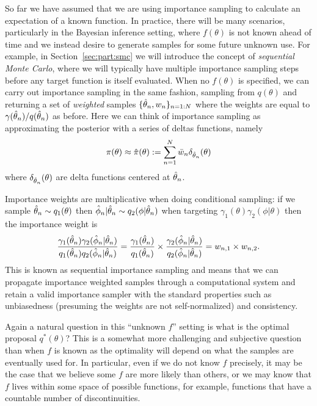 So far we have assumed that we are using importance sampling to calculate an expectation 
of a known function.  In practice, there will be many scenarios, particularly in the Bayesian inference setting,
where $f(\theta)$ is not known ahead of time and we instead desire to generate samples
for some future unknown use.  For example, in Section~\ref{sec:part:smc} we will introduce the concept
of \emph{sequential Monte Carlo}, where we will typically have multiple importance sampling steps
before any target function is itself evaluated.
When no $f(\theta)$ is specified, we can carry out importance sampling in the
same fashion, sampling from $q (\theta)$ and returning a set of \emph{weighted} samples
$\{\hat{\theta}_n,w_n\}_{n=1:N}$ where the weights are equal to $\gamma(\hat{\theta}_n) / q(\hat{\theta}_n)$ as before.
Here we can think of importance sampling as approximating the posterior with a series of deltas
functions, namely
\begin{align}
\label{eq:inf:imp-post-est}
\pi (\theta) \approx \hat{\pi}(\theta) := \sum_{n=1}^{N} \bar{w}_n \delta_{\hat{\theta}_n} (\theta)
\end{align}
where $\delta_{\hat{\theta}_n} (\theta)$ are delta functions centered at $\hat{\theta}_n$.

Importance weights are multiplicative when doing conditional
sampling: if we sample $\hat{\theta}_n \sim q_1(\theta)$ then $\hat{\phi}_n | \hat{\theta}_n \sim q_2(\phi | \hat{\theta}_n)$
when targeting $\gamma_1(\theta)\gamma_2(\phi|\theta)$ then the importance weight is 
\begin{align}
\label{eq:inf:prod-imp-weights}
\frac{\gamma_1(\hat{\theta}_n)\gamma_2(\hat{\phi}_n|\hat{\theta}_n)}{q_1(\hat{\theta}_n)q_2(\hat{\phi}_n | \hat{\theta}_n)}
=\frac{\gamma_1(\hat{\theta}_n)}{q_1(\hat{\theta}_n)}
\times\frac{\gamma_2(\hat{\phi}_n|\hat{\theta}_n)} {q_2(\hat{\phi}_n | \hat{\theta}_n)}= w_{n,1} \times w_{n,2}.
\end{align}
This is known as sequential importance sampling and means that we can propagate importance
weighted samples through a computational system and retain a valid importance
sampler with the standard properties such as unbiasedness (presuming the weights are not self-normalized) 
and consistency.

Again a natural question in this ``unknown $f$'' setting is what is the optimal proposal $q^*(\theta)$?
This is a somewhat more challenging and subjective question than when $f$ is known as the
optimality will depend on what the samples are eventually used for.  In particular, even if we do
not know $f$ precisely, it may be the case that we believe some $f$ are more likely than others, or we
may know that $f$ lives within some space of possible functions, for example, functions that have
a countable number of discontinuities.  

